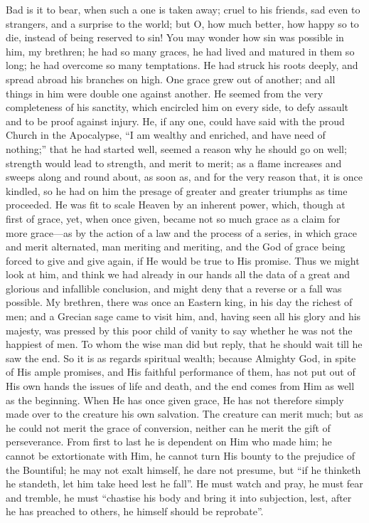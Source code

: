Bad is it to bear, when such a one is taken away; cruel to his
friends, sad even to strangers, and a surprise to the world; but O,
how much better, how happy so to die, instead of being reserved to
sin! You may wonder how sin was possible in him, my brethren; he had
so many graces, he had lived and matured in them so long; he had
overcome so many temptations. He had struck his roots deeply, and
spread abroad his branches on high. One grace grew out of another; and
all things in him were double one against another. He seemed from the
very completeness of his sanctity, which encircled him on every side,
to defy assault and to be proof against injury. He, if any one, could
have said with the proud Church in the Apocalypse, ``I am wealthy
and enriched, and have need of nothing;'' that he had started
well, seemed a reason why he should go on well; strength would lead to
strength, and merit to merit; as a flame increases and sweeps along
and round about, as soon as, and for the very reason that, it is once
kindled, so he had on him the presage of greater and greater triumphs
as time proceeded. He was fit to scale Heaven by an inherent power,
which, though at first of grace, yet, when once given, became not so
much grace as a claim for more grace—as by the action of a law and
the process of a series, in which grace and merit alternated, man
meriting and meriting, and the God of grace being forced to give and
give again, if He would be true to His promise. Thus we might look at
him, and think we had already in our hands all the data of a great and
glorious and infallible conclusion, and might deny that a reverse or a
fall was possible. My brethren, there was once an Eastern king, in his
day the richest of men; and a Grecian sage came to visit him, and,
having seen all his glory and his majesty, was pressed by this poor
child of vanity to say whether he was not the happiest of men. To whom
the wise man did but reply, that he should wait till he saw the end.
So it is as regards spiritual wealth; because Almighty God, in spite
of His ample promises, and His faithful performance of them, has not
put out of His own hands the issues of life and death, and the end
comes from Him as well as the beginning. When He has once given grace,
He has not therefore simply made over to the creature his own
salvation. The creature can merit much; but as he could not merit the
grace of conversion, neither can he merit the gift of perseverance.
From first to last he is dependent on Him who made him; he cannot be
extortionate with Him, he cannot turn His bounty to the prejudice of
the Bountiful; he may not exalt himself, he dare not presume, but
``if he thinketh he standeth, let him take heed lest he
fall''. He must watch and pray, he must fear and tremble, he must
``chastise his body and bring it into subjection, lest, after he
has preached to others, he himself should be reprobate''.

